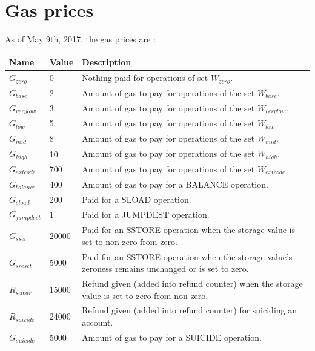 \documentclass{article}
\begin{document}
	\appendix

	\section{Gas prices}
		\label{app:gas-prices}

		As of May 9th, 2017, the gas prices are \cite{yellow-paper}: 
		\begin{table}[!ht]
		\footnotesize
		\noindent \begin{tabular}{| l | l | p{8cm} |}
			\hline
			Name 				& Value 	& Description \\ \hline
			$G_{zero}$ 			& 0 		& Nothing paid for operations of set $W_{zero}$. \\ \hline
			$G_{base}$ 			& 2 		& Amount of gas to pay for operations of the set $W_{base}$. \\ \hline
			$G_{verylow}$ 		& 3 		& Amount of gas to pay for operations of the set $W_{verylow}$. \\ \hline
			$G_{low}$ 			& 5 		& Amount of gas to pay for operations of the set $W_{low}$. \\ \hline
			$G_{mid}$ 			& 8 		& Amount of gas to pay for operations of the set $W_{mid}$. \\ \hline
			$G_{high}$ 			& 10 		& Amount of gas to pay for operations of the set $W_{high}$. \\ \hline
			$G_{extcode}$ 		& 700 		& Amount of gas to pay for operations of the set $W_{extcode}$. \\ \hline
			$G_{balance}$ 		& 400 		& Amount of gas to pay for a BALANCE operation. \\ \hline
			$G_{sload}$ 		& 200 		& Paid for a SLOAD operation. \\ \hline
			$G_{jumpdest}$ 		& 1 		& Paid for a JUMPDEST operation. \\ \hline
			$G_{sset}$ 			& 20000 	& Paid for an SSTORE operation when the storage value is set to non-zero from zero. \\ \hline
			$G_{sreset}$ 		& 5000 		& Paid for an SSTORE operation when the storage value's zeroness remains unchanged or is set to zero. \\ \hline
			$R_{sclear}$ 		& 15000		& Refund given (added into refund counter) when the storage value is set to zero from non-zero. \\ \hline
			$R_{suicide}$ 		& 24000 	& Refund given (added into refund counter) for suiciding an account. \\ \hline
			$G_{suicide}$ 		& 5000 		& Amount of gas to pay for a SUICIDE operation. \\ \hline

\end{tabular}
\end{table}
\end{document}
